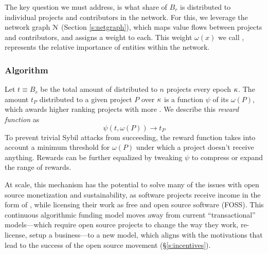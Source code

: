 The key question we must address, is what share of $B_r$ is distributed to
individual projects and contributors in the network.
For this, we leverage the \oscoin{} network graph $\mathcal{N}$ (Section
\ref{s:netgraph}), which maps value flows between projects and contributors,
and assigns a weight to each. This weight $\omega(x)$ we call \osrank{}, represents
the relative importance of entities within the network.

\subsubsection{Algorithm} Let $t \equiv B_r$ be the total amount of \oscoin{} distributed
to $n$ projects every epoch $\kappa$. The amount $t_P$ distributed to a given
project $P$ over $\kappa$ is a function $\psi$ of its \osrank{} $\omega(P)$,
which awards higher ranking projects with more \oscoin{}. We describe this
\emph{reward function} as
\[
    \psi(t, \omega(P)) \to t_P
\]
To prevent trivial Sybil attacks from succeeding, the reward function takes
into account a minimum threshold for $\omega(P)$ under which a project doesn't
receive anything. Rewards can be further equalized by tweaking $\psi$ to
compress or expand the range of rewards.

At scale, this mechanism has the potential to solve many of the issues with
open source monetization and sustainability, as software projects receive
income in the form of \oscoin{}, while licensing their work as free and
open source software (FOSS). This continuous algorithmic funding model moves
away from current ``transactional'' models---which require open source projects
to change the way they work, re-license, setup a business---to a new model,
which aligns with the motivations that lead to the success of the open source
movement (\S \ref{s:incentives}).
